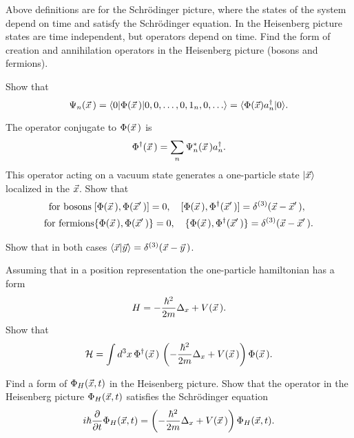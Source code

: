 \documentclass[a4paper,11pt]{article}
\begin{document}
\begin{enumerate}
  Above definitions are for the Schr\"{o}dinger picture, where the states of the system depend on time and satisfy the Schr\"{o}dinger equation. In the Heisenberg picture states are time independent, but operators depend on time. Find the form of creation and annihilation operators in the Heisenberg picture (bosons and fermions).

  Show that
  \begin{equation}
    \label{eq:22}
    \Psi_{ n }( \vec{ x } \, ) =
    \langle 0 | \Phi( \vec{ x } \, ) | 0, 0, \ldots, 0, 1_{ n }, 0, \ldots \rangle
    = \langle \Phi( \vec{ x } ) a_{ n }^{ \dagger } | 0 \rangle.
  \end{equation}

  The operator conjugate to $\Phi( \vec{ x } \, )$ is
  \begin{equation}
    \label{eq:23}
    \Phi^{ \dagger }( \vec{ x } \, ) =
    \sum_{ n } \Psi_{ n }^{ * }( \vec{ x } \, ) a_{ n }^{ \dagger }.
  \end{equation}
  This operator acting on a vacuum state generates a one-particle state $| \vec{ x } \rangle$ localized in the $\vec{ x }$. Show that
  \begin{align}
    \textrm{for bosons} \;
    &[ \Phi( \vec{ x } \, ), \Phi( \vec{ x }' \, ) ] = 0, \quad
      [ \Phi( \vec{ x } \, ), \Phi^{ \dagger }( \vec{ x }' \, ) ]
      = \delta^{ ( 3 ) }( \vec{ x } - \vec{ x }' \, ), \\
    \textrm{for fermions}
    &\{ \Phi( \vec{ x } \, ), \Phi( \vec{ x }' \, ) \} = 0, \quad
    \{ \Phi( \vec{ x } \, ), \Phi^{ \dagger }( \vec{ x }' \, ) \}
    = \delta^{ ( 3 ) }( \vec{ x } - \vec{ x }' \, ).
  \end{align}

  Show that in both cases $\langle \vec{ x } | \vec{ y } \rangle = \delta^{ ( 3 ) }( \vec{ x } - \vec{ y } \, )$.

  Assuming that in a position representation the one-particle hamiltonian has a form
  \begin{equation}
    \label{eq:24}
    H = -\frac{ \hbar^{ 2 } }{ 2m } \Delta_{ x } + V( \vec{ x } \, ).
  \end{equation}
  Show that
  \begin{equation}
    \label{eq:25}
    \mathcal{H} =
    \int d^{ 3 } x \, \Phi^{ \dagger }( \vec{ x } \, ) \,
    \left( -\frac{ \hbar^{ 2 } }{ 2m } \Delta_{ x } + V( \vec{ x } \, ) \right)
    \Phi( \vec{ x } \, ).
  \end{equation}

  Find a form of $\Phi_{ H }( \vec{ x }, t )$ in the Heisenberg picture.
  Show that the operator in the Heisenberg picture $\Phi_{ H }( \vec{ x }, t )$ satisfies the Schr\"{o}dinger equation
  \begin{equation}
    \label{eq:26}
    i \hbar \frac{ \partial }{ \partial t } \Phi_{ H }( \vec{ x }, t )
    =
    \left( -\frac{ \hbar^{ 2 } }{ 2m } \Delta_{ x } + V( \vec{ x } \, ) \right)
    \Phi_{ H }( \vec{ x }, t ).
  \end{equation}


\end{enumerate}
\end{document}
